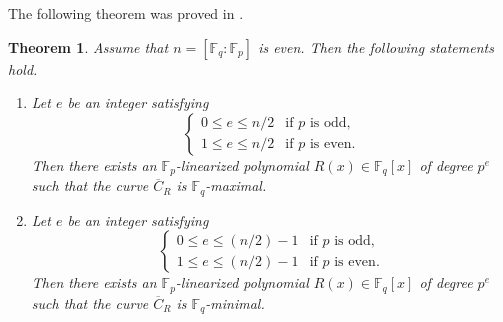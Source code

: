 \documentclass[12pt,a4paper]{amsart}
\newtheorem{theorem}{Theorem}[section]
\theoremstyle{definition}
\def\F{{\mathbb F}}
\theoremstyle{remark}
\begin{document}
The following theorem was proved in \cite[Theorem~5.9]{CO0}. 

\begin{theorem}\label{theorem: existence of extremal curves}
Assume that $n=[\F_q:\F_p]$ is even. 
Then the following statements hold. 
\begin{enumerate}
    \item Let $e$ be an integer satisfying 
    \[
\begin{cases}
0 \le e \le n/2 & \textrm{if $p$ is odd}, \\
1 \le e \le n/2 &\textrm{if $p$ is even}. 
\end{cases}
\]
Then there exists an $\F_p$-linearized polynomial $R(x) \in \F_q[x]$ of degree $p^e$ such that the curve $\overline{C}_R$ is $\F_q$-maximal. 
    \item Let $e$ be an integer satisfying 
    \[
\begin{cases}
0 \le e \le (n/2)-1 & \textrm{if $p$ is odd}, \\
1 \le e \le (n/2)-1 &\textrm{if $p$ is even}. 
\end{cases}
\]
Then there exists an $\F_p$-linearized polynomial $R(x) \in \F_q[x]$ of degree $p^e$ such that the curve $\overline{C}_R$ is $\F_q$-minimal. 
\end{enumerate}
\end{theorem}
\end{document}
